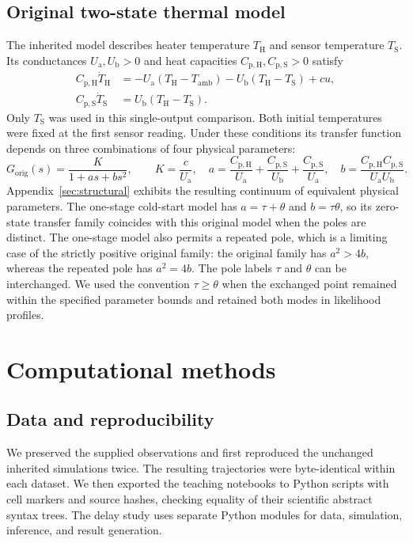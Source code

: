 \documentclass[11pt]{article}
\newcommand{\Ua}{U_{\mathrm a}}
\newcommand{\Ub}{U_{\mathrm b}}
\newcommand{\CpH}{C_{\mathrm{p,H}}}
\newcommand{\CpS}{C_{\mathrm{p,S}}}
\newcommand{\Tamb}{T_{\mathrm{amb}}}
\begin{document}
\subsection{Original two-state thermal model}
The inherited model describes heater temperature $T_{\mathrm H}$ and sensor
temperature $T_{\mathrm S}$. Its conductances $\Ua,\Ub>0$ and heat capacities
$\CpH,\CpS>0$ satisfy
\begin{align}
 \CpH\dot T_{\mathrm H}&=-\Ua(T_{\mathrm H}-\Tamb)
                       -\Ub(T_{\mathrm H}-T_{\mathrm S})+cu,\\
 \CpS\dot T_{\mathrm S}&=\Ub(T_{\mathrm H}-T_{\mathrm S}).
 \label{eq:original}
\end{align}
Only $T_{\mathrm S}$ was used in this single-output comparison. Both initial
temperatures were fixed at the first sensor reading. Under these conditions its
transfer function depends on three combinations of four physical parameters:
\begin{equation}
 G_{\mathrm{orig}}(s)=\frac{K}{1+a s+b s^2},\qquad
 K=\frac{c}{\Ua},\quad
 a=\frac{\CpH}{\Ua}+\frac{\CpS}{\Ub}+\frac{\CpS}{\Ua},\quad
 b=\frac{\CpH\CpS}{\Ua\Ub}.
 \label{eq:original-transfer}
\end{equation}
Appendix~\ref{sec:structural} exhibits the resulting continuum of equivalent
physical parameters. The one-stage cold-start model has $a=\tau+\theta$ and
$b=\tau\theta$, so its zero-state transfer family coincides with this original
model when the poles are distinct. The one-stage model also permits a repeated
pole, which is a limiting case of the strictly positive original family:
the original family has $a^2>4b$, whereas the repeated pole has $a^2=4b$.
The pole labels $\tau$ and $\theta$ can be interchanged. We used the
convention $\tau\geq\theta$ when the exchanged point remained within the
specified parameter bounds and retained both modes in likelihood profiles.



\section{Computational methods}
\label{sec:methods}

\subsection{Data and reproducibility}
We preserved the supplied observations and first reproduced the unchanged
inherited simulations twice. The resulting trajectories were byte-identical
within each dataset. We then exported the teaching notebooks to Python scripts
with cell markers and source hashes, checking equality of their scientific
abstract syntax trees. The delay study uses separate Python modules for data,
simulation, inference, and result generation.
\end{document}
